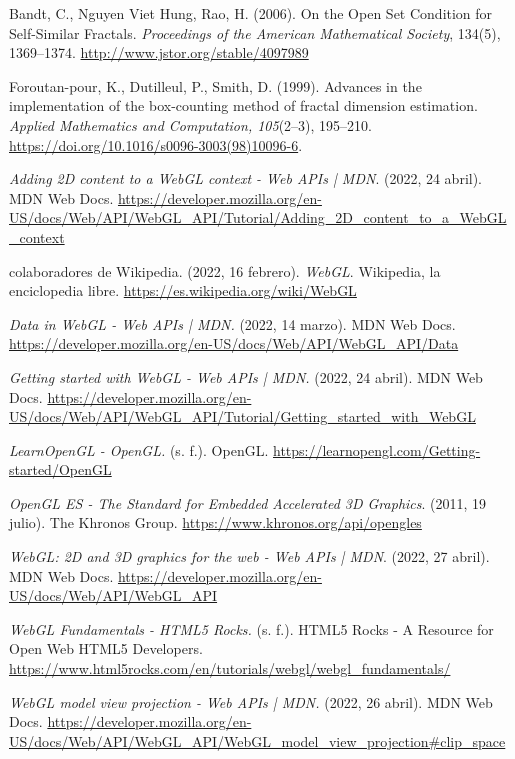 \begin{thebibliography}{99}
 Bandt, C., Nguyen Viet Hung, Rao, H. (2006). On the Open Set Condition for Self-Similar Fractals. \textit{Proceedings of the American Mathematical Society}, 134(5), 1369–1374. \url{http://www.jstor.org/stable/4097989}


 Foroutan-pour, K., Dutilleul, P., Smith, D. (1999). Advances in the implementation of the box-counting method of fractal dimension estimation. \textit{Applied Mathematics and Computation, 105}(2–3), 195–210. \url{https://doi.org/10.1016/s0096-3003(98)10096-6}.

 \textit{Adding 2D content to a WebGL context - Web APIs | MDN}. (2022, 24 abril). MDN Web Docs. \url{https://developer.mozilla.org/en-US/docs/Web/API/WebGL_API/Tutorial/Adding_2D_content_to_a_WebGL_context}

 colaboradores de Wikipedia. (2022, 16 febrero). \textit{WebGL}. Wikipedia, la enciclopedia libre. \url{https://es.wikipedia.org/wiki/WebGL}



 \textit{Data in WebGL - Web APIs | MDN.} (2022, 14 marzo). MDN Web Docs. \url{https://developer.mozilla.org/en-US/docs/Web/API/WebGL_API/Data}

 \textit{Getting started with WebGL - Web APIs | MDN.} (2022, 24 abril). MDN Web Docs. \url{https://developer.mozilla.org/en-US/docs/Web/API/WebGL_API/Tutorial/Getting_started_with_WebGL}

 \textit{LearnOpenGL - OpenGL.} (s. f.). OpenGL. \url{https://learnopengl.com/Getting-started/OpenGL}

 \textit{OpenGL ES - The Standard for Embedded Accelerated 3D Graphics}. (2011, 19 julio). The Khronos Group. \url{https://www.khronos.org/api/opengles}

 \textit{WebGL: 2D and 3D graphics for the web - Web APIs | MDN}. (2022, 27 abril). MDN Web Docs. \url{https://developer.mozilla.org/en-US/docs/Web/API/WebGL_API}

 \textit{WebGL Fundamentals - HTML5 Rocks.} (s. f.). HTML5 Rocks - A Resource for Open Web HTML5 Developers. \url{https://www.html5rocks.com/en/tutorials/webgl/webgl_fundamentals/}

 \textit{WebGL model view projection - Web APIs | MDN.} (2022, 26 abril). MDN Web Docs. \url{https://developer.mozilla.org/en-US/docs/Web/API/WebGL_API/WebGL_model_view_projection#clip_space}


\end{thebibliography}
